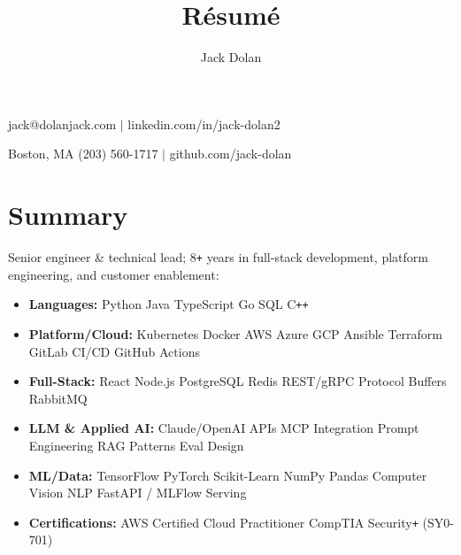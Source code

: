 \documentclass[10pt]{extarticle}
\makeatletter
\renewcommand{\maketitle}{ 
{\huge\bfseries\theauthor}\hfill jack@dolanjack.com $|$ linkedin.com/in/jack-dolan2

\vspace{0.2em} 

Boston, MA \hfill (203) 560-1717 $|$ github.com/jack-dolan
}
\makeatother
\begin{document}
 
\title{R\'esum\'e} 
\author{Jack Dolan} 
\maketitle
{}


\section{Summary}
\hspace*{-0.4cm}Senior engineer \& technical lead; 8\verb!+! years in full-stack development, platform engineering, and customer enablement:
    \begin{itemize}
    \itemsep0em
    \item \textbf{Languages:} Python \text{\textbar} Java \text{\textbar} TypeScript \text{\textbar} Go \text{\textbar} SQL \text{\textbar} C\verb!++!
    \item \textbf{Platform/Cloud:} Kubernetes \text{\textbar} Docker \text{\textbar} AWS \text{\textbar} Azure \text{\textbar} GCP \text{\textbar} Ansible \text{\textbar} Terraform \text{\textbar} GitLab CI/CD \text{\textbar} GitHub Actions
    \item \textbf{Full-Stack:} React \text{\textbar} Node.js \text{\textbar} PostgreSQL \text{\textbar} Redis \text{\textbar} REST/gRPC \text{\textbar} Protocol Buffers \text{\textbar} RabbitMQ
    \item \textbf{LLM \& Applied AI:} Claude/OpenAI APIs \text{\textbar} MCP Integration \text{\textbar} Prompt Engineering \text{\textbar} RAG Patterns \text{\textbar} Eval Design
    \item \textbf{ML/Data:} TensorFlow \text{\textbar} PyTorch \text{\textbar} Scikit-Learn \text{\textbar} NumPy \text{\textbar} Pandas \text{\textbar} Computer Vision \text{\textbar} NLP \text{\textbar} FastAPI / MLFlow Serving
    \item \textbf{Certifications:} AWS Certified Cloud Practitioner \text{\textbar} CompTIA Security\verb!+! (SY0-701) \end{itemize}  
\end{document}
